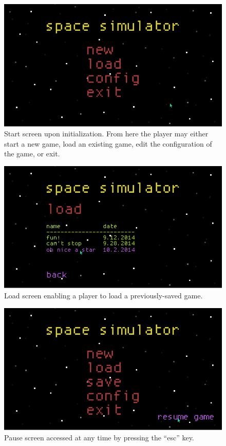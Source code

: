 \begin{figure}[H]
  \centering
  \includegraphics[scale=0.5]{../images/01-start.png}
  \caption{Start screen upon initialization.  From here the player may either start a new game, load an existing game, edit the configuration of the game, or exit.}
\end{figure}

\begin{figure}[H]
  \centering
  \includegraphics[scale=0.5]{../images/02-load.png}
  \caption{Load screen enabling a player to load a previously-saved game.}
\end{figure}

\begin{figure}[H]
  \centering
  \includegraphics[scale=0.5]{../images/03-pause.png}
  \caption{Pause screen accessed at any time by pressing the ``esc'' key.}
\end{figure}

